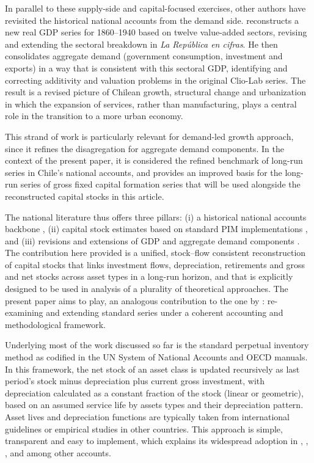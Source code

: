 \documentclass[11pt,a4paper]{article}
\begin{document}
In parallel to these supply-side and capital-focused exercises, other authors have revisited the historical national accounts from the demand side. \citet{PerezEyzaguirre2019} reconstructs a new real GDP series for 1860--1940 based on twelve value-added sectors, revising and extending the sectoral breakdown in \emph{La Rep\'{u}blica en cifras}. He then consolidates aggregate demand (government consumption, investment and exports) in a way that is consistent with this sectoral GDP, identifying and correcting additivity and valuation problems in the original Clio-Lab series. The result is a revised picture of Chilean growth, structural change and urbanization in which the expansion of services, rather than manufacturing, plays a central role in the transition to a more urban economy.

This strand of work is particularly relevant for demand-led growth approach, since it refines the disagregation for aggregate demand components. In the context of the present paper, it is considered the refined benchmark of long-run series in Chile's national accounts, and provides an improved basis for the long-run series of gross fixed capital formation series that will be used alongside the reconstructed capital stocks in this article. 

The national literature thus offers three pillars: (i) a historical national accounts backbone \citep{Luders2016}, (ii) capital stock estimates based on standard PIM implementations \citep{Diaz2016}, and (iii) revisions and extensions of GDP and aggregate demand components \citep{PerezEyzaguirre2019}. The contribution here provided is a unified, stock--flow consistent reconstruction of capital stocks that links investment flows, depreciation, retirements and gross and net stocks across asset types in a long-run horizon, and that is explicitly designed to be used in analysis of a plurality of theoretical approaches. The present paper aims to play, an analogous contribution to the one by \citet{PerezEyzaguirre2019}: re-examining and extending standard series under a coherent accounting and methodological framework.

Underlying most of the work discussed so far is the standard perpetual inventory method as codified in the UN System of National Accounts and OECD manuals. In this framework, the net stock of an asset class is updated recursively as last period's stock minus depreciation plus current gross investment, with depreciation calculated as a constant fraction of the stock (linear or geometric), based on an assumed service life by assets types and their depreciation pattern. Asset lives and depreciation functions are typically taken from international guidelines or empirical studies in other countries. This approach is simple, transparent and easy to implement, which explains its widespread adoption in \citet{DiazWagner2016}, \cite{Aguilar2001}, \citet{Hofman2000}, and \citet{TafunellDucoing2016} among other accounts. 
\end{document}
